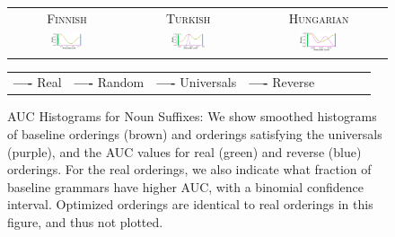 \documentclass[11pt,letterpaper]{article}
\begin{document}
\begin{figure}
\begin{center}
\begin{tabular}{ccc}
\textsc{Finnish} & \textsc{Turkish} & \textsc{Hungarian} \\
    \includegraphics[width=0.3\textwidth]{figures/finnish_nouns/suffixes-byMorphemes-auc-hist-heldout-Coarse-FineSurprisal-optimized.pdf}
    &
    \includegraphics[width=0.3\textwidth]{figures/turkish_nouns/suffixes-byMorphemes-auc-hist-heldout-Coarse-FineSurprisal-optimized.pdf}
    &
    \includegraphics[width=0.3\textwidth]{figures/hungarian_nouns/suffixes-byMorphemes-auc-hist-heldout-Coarse-FineSurprisal-optimized.pdf}
    \end{tabular}
    
    \begin{tabular}{llllllll}
\textbf{\textcolor{real}{----}} Real&
\textbf{\textcolor{random}{----}} Random&
\textbf{\textcolor{universals}{----}} Universals&
\textbf{\textcolor{reverse}{----}} Reverse
\end{tabular}
\end{center}
    
    \caption{AUC Histograms for Noun Suffixes: We show smoothed histograms of baseline orderings (brown) and orderings satisfying the universals (purple), and the AUC values for real (green) and reverse (blue) orderings. For the real orderings, we also indicate what fraction of baseline grammars have higher AUC, with a binomial confidence interval. Optimized orderings are identical to real orderings in this figure, and thus not plotted.  }
    \label{fig:auc_nouns}
\end{figure}
\end{document}
